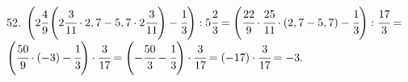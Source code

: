 52. $\left(2\cfrac{4}{9}\left(2\cfrac{3}{11}\cdot2,7-5,7\cdot2\cfrac{3}{11}\right)-\cfrac{1}{3}\right):5\cfrac{2}{3}=
\left(\cfrac{22}{9}\cdot\cfrac{25}{11}\cdot\left(2,7-5,7\right)-\cfrac{1}{3}\right):\cfrac{17}{3}=$\\$
\left(\cfrac{50}{9}\cdot\left(-3\right)-\cfrac{1}{3}\right)\cdot\cfrac{3}{17}=
\left(-\cfrac{50}{3}-\cfrac{1}{3}\right)\cdot\cfrac{3}{17}=
(-17)\cdot\cfrac{3}{17}=-3.$\\
